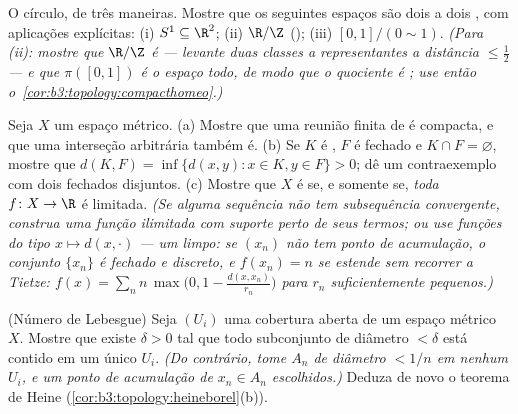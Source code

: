 \begin{exercise}[$\star\star$]\label{exo:b3:topology:5}
O círculo, de três maneiras. Mostre que os seguintes espaços são dois a
dois , com aplicações explícitas: (i) $S^1 \subseteq \R^2$; (ii)
$\R/\Z$ (); (iii) $[0,1]/(0 \sim 1)$. \emph{(Para (ii):
mostre que $\R/\Z$ é  --- levante duas classes a
representantes a distância $\leq \frac12$ --- e que $\pi([0,1])$ é o espaço todo, de
modo que o quociente é ; use então o~\cref{cor:b3:topology:compacthomeo}.)}
\end{exercise}

\begin{exercise}[$\star\star$]\label{exo:b3:topology:6}
Seja $X$ um espaço métrico.
(a) Mostre que uma reunião finita de  é compacta, e que uma
interseção arbitrária também é.
(b) Se $K$ é , $F$ é fechado e $K \cap F = \varnothing$, mostre que $d(K, F) = \inf\{d(x,y) : x \in K, y \in F\} > 0$;
dê um contraexemplo com dois fechados disjuntos.
(c) Mostre que $X$ é  se, e somente se, \emph{toda}
 $f
\colon X \to \R$ é limitada. \emph{(Se alguma sequência não tem
subsequência convergente, construa uma função  ilimitada com
suporte perto de seus termos; ou use funções do tipo $x \mapsto
d(x, \cdot)$ --- um
 limpo: se $(x_n)$ não tem ponto de acumulação, o conjunto
$\{x_n\}$ é fechado e discreto, e $f(x_n) = n$ se estende  sem
recorrer a Tietze: $f(x) = \sum_n n\,\max\bigl(0, 1 - \frac{d(x, x_n)}{r_n}\bigr)$ para $r_n$ suficientemente pequenos.)}
\end{exercise}

\begin{exercise}[$\star\star$]\label{exo:b3:topology:7}
(Número de Lebesgue) Seja $(U_i)$ uma cobertura aberta de um espaço
métrico  $X$. Mostre que existe $\delta > 0$ tal que todo
subconjunto de diâmetro $< \delta$ está contido em um único $U_i$.
\emph{(Do contrário, tome $A_n$ de diâmetro $< 1/n$ em nenhum
$U_i$, e um ponto de acumulação de $x_n \in A_n$ escolhidos.)} Deduza de novo
o teorema de Heine (\cref{cor:b3:topology:heineborel}(b)).
\end{exercise}


